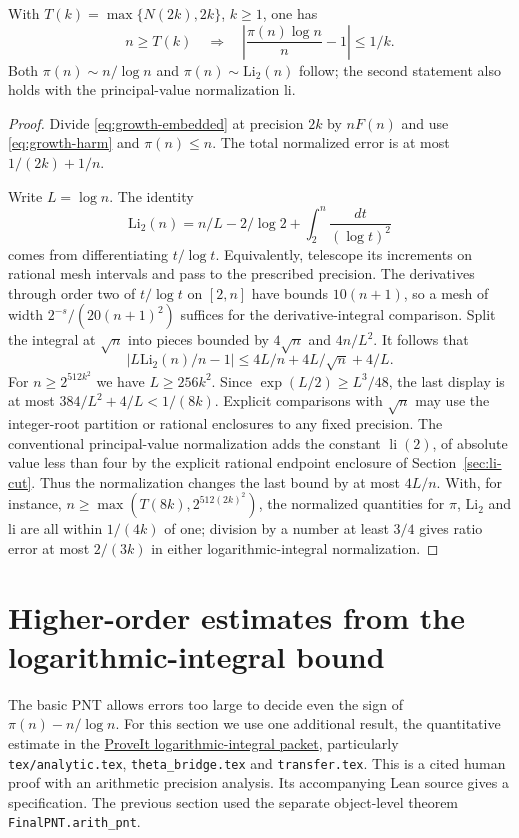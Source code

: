 \begin{theorem}
With $T(k)=\max\{N(2k),2k\}$, $k\ge1$, one has
\[
 n\ge T(k)\quad\Longrightarrow\quad
 \left|\frac{\pi(n)\log n}{n}-1\right|\le1/k .
\]
Both $\pi(n)\sim n/\log n$ and $\pi(n)\sim\mathrm{Li}_2(n)$ follow; the second statement also holds with the principal-value normalization $\mathrm{li}$.
\end{theorem}
\begin{proof}
Divide \eqref{eq:growth-embedded} at precision $2k$ by $nF(n)$ and use \eqref{eq:growth-harm} and $\pi(n)\le n$. The total normalized error is at most $1/(2k)+1/n$.

Write $L=\log n$. The identity
\[
 \mathrm{Li}_2(n)=n/L-2/\log2+\int_2^n\frac{dt}{(\log t)^2}
\]
comes from differentiating $t/\log t$. Equivalently, telescope its increments on rational mesh intervals and pass to the prescribed precision. The derivatives through order two of $t/\log t$ on $[2,n]$ have bounds $10(n+1)$, so a mesh of width $2^{-s}/(20(n+1)^2)$ suffices for the derivative-integral comparison. Split the integral at $\sqrt n$ into pieces bounded by $4\sqrt n$ and $4n/L^2$. It follows that
\[
 |L\mathrm{Li}_2(n)/n-1|\le4L/n+4L/\sqrt n+4/L.
\]
For $n\ge2^{512 k^2}$ we have $L\ge256 k^2$. Since $\exp(L/2)\ge L^3/48$, the last display is at most $384/L^2+4/L<1/(8k)$. Explicit comparisons with $\sqrt n$ may use the integer-root partition or rational enclosures to any fixed precision. The conventional principal-value normalization adds the constant $\operatorname{li}(2)$, of absolute value less than four by the explicit rational endpoint enclosure of Section~\ref{sec:li-cut}. Thus the normalization changes the last bound by at most $4L/n$. With, for instance, $n\ge\max(T(8k),2^{512(2k)^2})$, the normalized quantities for $\pi$, $\mathrm{Li}_2$ and $\mathrm{li}$ are all within $1/(4k)$ of one; division by a number at least $3/4$ gives ratio error at most $2/(3k)$ in either logarithmic-integral normalization.
\end{proof}

\section{Higher-order estimates from the logarithmic-integral bound}
\label{sec:growthrefine}

The basic PNT allows errors too large to decide even the sign of $\pi(n)-n/\log n$. For this section we use one additional result, the quantitative estimate in the \href{https://github.com/VladimirReshetnikov/ProveIt/tree/a9c0f1949be61679ed2e219b97dc42ecb7ae91a9/Logic/PrimitiveRecursiveArithmetic/docs/proofs/analytic-number-theory/pnt_li_ipra_2026-11-15}{ProveIt logarithmic-integral packet}, particularly \texttt{tex/analytic.tex}, \texttt{theta\_bridge.tex} and \texttt{transfer.tex}. This is a cited human proof with an arithmetic precision analysis. Its accompanying Lean source gives a specification. The previous section used the separate object-level theorem \texttt{FinalPNT.arith\_pnt}.

